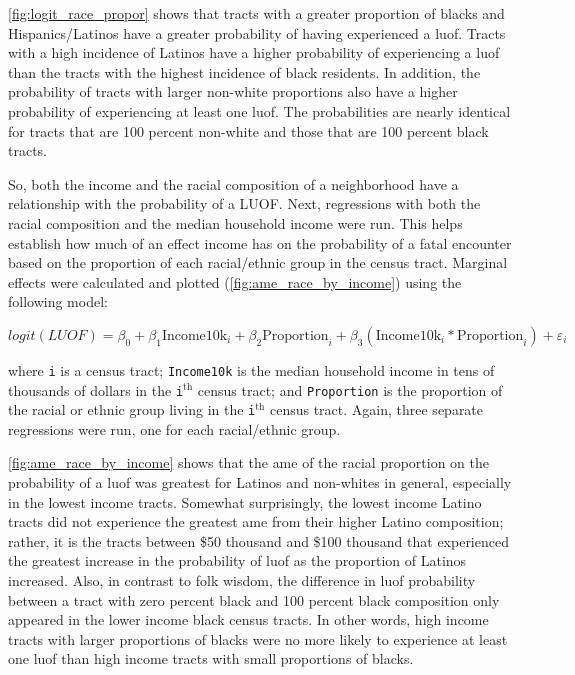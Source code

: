 \documentclass[12pt]{article}
\begin{document}
\autoref{fig:logit_race_propor} shows that tracts with a greater proportion of blacks and Hispanics/Latinos have a greater probability of having experienced a \acrfull{luof}. Tracts with a high incidence of Latinos have a higher probability of experiencing a \acrshort{luof} than the tracts with the highest incidence of black residents. In addition, the probability of tracts with larger non-white proportions also have a higher probability of experiencing at least one \acrshort{luof}. The probabilities are nearly identical for tracts that are 100 percent non-white and those that are 100 percent black tracts.

So, both the income and the racial composition of a neighborhood have a relationship with the probability of a LUOF. Next, regressions with both the racial composition and the median household income were run. This helps establish how much of an effect income has on the probability of a fatal encounter based on the proportion of each racial/ethnic group in the census tract. Marginal effects were calculated and plotted (\autoref{fig:ame_race_by_income}) using the following model:

\begin{equation}
logit(LUOF) = \beta_0 + \beta_1 \text{Income10k}_i + \beta_2 \text{Proportion}_i + \beta_3 (\text{Income10k}_i \ast \text{Proportion}_i) + \varepsilon_i
\label{eq:logit_interaction}
\end{equation}

\noindent{}where \texttt{i} is a census tract; \texttt{Income10k} is the median household income in tens of thousands of dollars in the \texttt{i}$^\text{th}$ census tract; and \texttt{Proportion} is the proportion of the racial or ethnic group living in the \texttt{i}$^\text{th}$ census tract. Again, three separate regressions were run, one for each racial/ethnic group.

\autoref{fig:ame_race_by_income} shows that the \gls{ame} of the racial proportion on the probability of a \acrshort{luof} was greatest for Latinos and non-whites in general, especially in the lowest income tracts. Somewhat surprisingly, the lowest income Latino tracts did not experience the greatest \acrshort{ame} from their higher Latino composition; rather, it is the tracts between \$50 thousand and \$100 thousand that experienced the greatest increase in the probability of \acrshort{luof} as the proportion of Latinos increased. Also, in contrast to folk wisdom, the difference in \acrshort{luof} probability between a tract with zero percent black and 100 percent black composition only appeared in the lower income black census tracts. In other words, high income tracts with larger proportions of blacks were no more likely to experience at least one \acrshort{luof} than high income tracts with small proportions of blacks.
\end{document}
